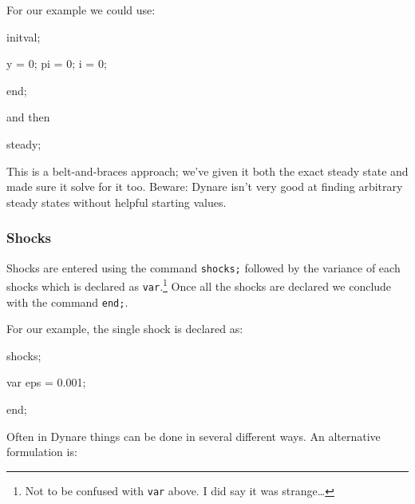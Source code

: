 \documentclass[
  letterpaper,
]{book}
\newenvironment{Shaded}{\begin{snugshade}}{\end{snugshade}}
\newcommand{\FloatTok}[1]{\textcolor[rgb]{0.68,0.00,0.00}{#1}}
\newcommand{\KeywordTok}[1]{\textcolor[rgb]{0.00,0.23,0.31}{#1}}
\newcommand{\OperatorTok}[1]{\textcolor[rgb]{0.37,0.37,0.37}{#1}}
\newcommand{\VariableTok}[1]{\textcolor[rgb]{0.07,0.07,0.07}{#1}}
\begin{document}
For our example we could use:

\begin{Shaded}
\begin{Highlighting}[]
\VariableTok{initval}\OperatorTok{;}

    \VariableTok{y}  \OperatorTok{=} \FloatTok{0}\OperatorTok{;}
    \VariableTok{pi} \OperatorTok{=} \FloatTok{0}\OperatorTok{;}
    \VariableTok{i}  \OperatorTok{=} \FloatTok{0}\OperatorTok{;}

\KeywordTok{end}\OperatorTok{;}
\end{Highlighting}
\end{Shaded}

and then

\begin{Shaded}
\begin{Highlighting}[]
\VariableTok{steady}\OperatorTok{;}
\end{Highlighting}
\end{Shaded}

This is a belt-and-braces approach; we've given it both the exact steady
state and made sure it solve for it too. Beware: Dynare isn't very good
at finding arbitrary steady states without helpful starting values.

\hypertarget{shocks}{%
\subsubsection{Shocks}\label{shocks}}

Shocks are entered using the command \texttt{shocks;} followed by the
variance of each shocks which is declared as \texttt{var}.\footnote{Not
  to be confused with \texttt{var} above. I did say it was
  strange\ldots{}} Once all the shocks are declared we conclude with the
command \texttt{end;}.

For our example, the single shock is declared as:

\begin{Shaded}
\begin{Highlighting}[]
\VariableTok{shocks}\OperatorTok{;}

    \VariableTok{var} \VariableTok{eps} \OperatorTok{=} \FloatTok{0.001}\OperatorTok{;}

\KeywordTok{end}\OperatorTok{;}
\end{Highlighting}
\end{Shaded}

Often in Dynare things can be done in several different ways. An
alternative formulation is:
\end{document}
